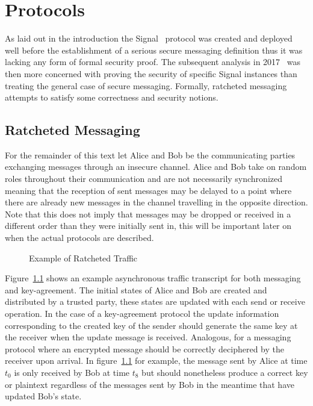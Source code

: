 \documentclass[11pt,a4paper,twoside,openright,bibliography=totoc]{scrbook}
\begin{document}
\chapter{Protocols}
\label{chap:protocols}

As laid out in the introduction the Signal~\cite{perrin2016double}
protocol was created and deployed well before the establishment of a
serious secure messaging definition thus it was lacking any form of
formal security proof. The subsequent analysis in 2017~\cite{cohn2017formal}
was then more concerned with proving the security of specific Signal
instances than treating the general case of secure
messaging. Formally, ratcheted messaging attempts to satisfy some
correctness and security notions.

\section{Ratcheted Messaging}
\label{sec:ratcheted-messaging}

For the remainder of this text let Alice and Bob be the communicating
parties exchanging messages through an insecure channel. Alice and Bob take on random
roles throughout their communication and are not necessarily
synchronized meaning that the reception of sent messages may be
delayed to a point where there are already new messages in the channel
travelling in the opposite direction. Note that this does not imply
that messages may be dropped or received in a different order than
they were initially sent in, this will be important later on when
the actual protocols are described.
\begin{figure}[ht]
  \centering
   
  \caption{Example of Ratcheted Traffic}
  \label{fig:traffic}
\end{figure}
Figure~\ref{fig:traffic} shows an example asynchronous traffic
transcript for both messaging and key-agreement. The initial states of
Alice and Bob are created and distributed by a trusted party, these
states are updated with each send or receive operation. In the case of
a key-agreement protocol the update information corresponding to the
created key of the sender should generate the same key at the receiver
when the update message is received. Analogous, for a messaging
protocol where an encrypted message should be correctly deciphered by
the receiver upon arrival. In figure~\ref{fig:traffic} for example,
the message sent by Alice at time $t_0$ is only received by Bob at
time $t_8$ but should nonetheless produce a correct key or plaintext
regardless of the messages sent by Bob in the meantime that have
updated Bob's state.
\end{document}
